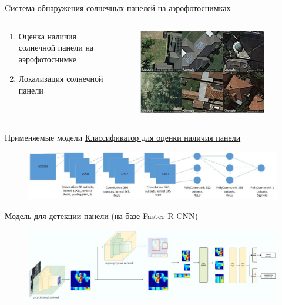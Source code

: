 \documentclass[10pt]{beamer}
\begin{document}
\begin{frame}{Cистема обнаружения солнечных панелей на аэрофотоснимках}
\begin{columns}
\begin{column}{0.5\textwidth}
                    \begin{enumerate}
                    \item Оценка наличия солнечной панели на аэрофотоснимке
                    \item Локализация солнечной панели
                    \end{enumerate}
                \end{column}
                \begin{column}{0.5\textwidth}
                    \begin{figure}
                        \centering
                        \includegraphics[width=0.9\textwidth]{pic4-17.png}
                    \end{figure}
                \end{column}
            \end{columns}
        \end{frame}

        \begin{frame}{Применяемые модели}
            \underline{Классификатор для оценки наличия панели}
            \begin{figure}
                \centering
                \includegraphics[width=1\textwidth]{pic4-19.jpg}
            \end{figure}
            \underline{Модель для детекции панели (на базе Faster R-CNN)}
            \begin{figure}
                \centering
                \includegraphics[width=1\textwidth]{pic4-21.jpg}
            \end{figure}
        \end{frame}
\end{document}

